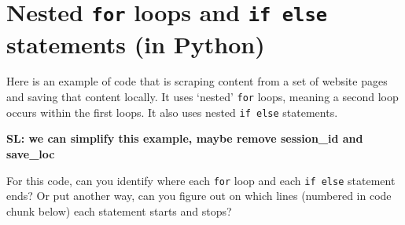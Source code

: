 \documentclass[
]{book}
\begin{document}
\section{\texorpdfstring{Nested \texttt{for} loops and \texttt{if\ else} statements (in Python)}{Nested for loops and if else statements (in Python)}}\label{nested-for-loops-and-if-else-statements-in-python}

Here is an example of code that is scraping content from a set of website pages and saving that content locally. It uses `nested' \texttt{for} loops, meaning a second loop occurs within the first loops. It also uses nested \texttt{if\ else} statements.

\textbf{SL: we can simplify this example, maybe remove session\_id and save\_loc}

For this code, can you identify where each \texttt{for} loop and each \texttt{if\ else} statement ends? Or put another way, can you figure out on which lines (numbered in code chunk below) each statement starts and stops?
\end{document}

